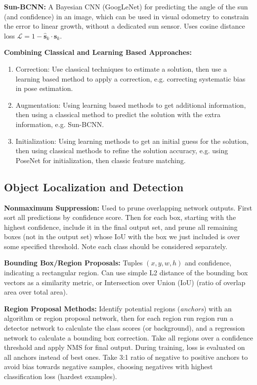 \documentclass[twocolumn, 10pt]{extarticle}
\begin{document}
\textbf{Sun-BCNN:} A Bayesian CNN (GoogLeNet) for predicting the angle of the sun (and confidence) in an image, which can
be used in visual odometry to constrain the error to linear growth, without a dedicated sun sensor. Uses cosine distance
loss \(\mathcal L = 1 - \hat{\bm s}_k \cdot \bm s_k\).

\textbf{Combining Classical and Learning Based Approaches:}
\begin{enumerate}
    \item Correction: Use classical techniques to estimate a solution, then use a learning based method to apply a correction, e.g. correcting systematic bias in pose estimation.
    \item Augmentation: Using learning based methods to get additional information, then using a classical method to predict the solution with the extra information, e.g. Sun-BCNN.
    \item Initialization: Using learning methods to get an initial guess for the solution, then using classical methods to refine the solution accuracy, e.g. using PoseNet for initialization, then classic feature matching.
\end{enumerate}

\subsection{Object Localization and Detection}

\textbf{Nonmaximum Suppression:} Used to prune overlapping network outputs. First sort all predictions by confidence
score. Then for each box, starting with the highest confidence, include it in the final output set, and prune all
remaining boxes (not in the output set) whose IoU with the box we just included is over some specified threshold. Note
each class should be considered separately.

\textbf{Bounding Box/Region Proposals:} Tuples \((x, y, w, h)\) and confidence, indicating a rectangular region. Can use
simple L2 distance of the bounding box vectors as a similarity metric, or Intersection over Union (IoU) (ratio of
overlap area over total area).

\textbf{Region Proposal Methods:} Identify potential regions (\textit{anchors}) with an algorithm or region proposal
network, then for each region run region run a detector network to calculate the class scores (or background), and a
regression network to calculate a bounding box correction. Take all regions over a confidence threshold and apply NMS
for final output.
During training, loss is evaluated on all anchors instead of best ones. Take 3:1 ratio of negative to positive anchors
to avoid bias towards negative samples, choosing negatives with highest classification loss (hardest examples).
\end{document}
